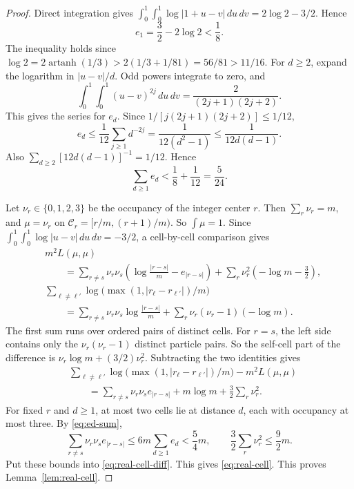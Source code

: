 \begin{proof}
Direct integration gives \(\int_0^1\!\int_0^1\log|1+u-v|\,du\,dv=2\log2-3/2\). Hence
\[
 e_1=\frac32-2\log2<\frac18.
\]
The inequality holds since \(\log2=2\operatorname{artanh}(1/3)>2(1/3+1/81)=56/81>11/16\). For \(d\ge2\), expand the logarithm in \(|u-v|/d\). Odd powers integrate to zero, and
\[
 \int_0^1\!\int_0^1(u-v)^{2j}\,du\,dv
 =\frac{2}{(2j+1)(2j+2)}.
\]
This gives the series for \(e_d\). Since \(1/[j(2j+1)(2j+2)]\le1/12\),
\[
 e_d\le\frac1{12}\sum_{j\ge1}d^{-2j}
 =\frac1{12(d^2-1)}\le\frac1{12d(d-1)}.
\]
Also \(\sum_{d\ge2}[12d(d-1)]^{-1}=1/12\). Hence
\begin{equation}\label{eq:ed-sum}
 \sum_{d\ge1}e_d<\frac18+\frac1{12}=\frac5{24}.
\end{equation}

Let \(\nu_r\in\{0,1,2,3\}\) be the occupancy of the integer center \(r\). Then \(\sum_r \nu_r=m\), and \(\mu=\nu_r\) on \(\mathcal C_r=[r/m,(r+1)/m)\). So \(\int\mu=1\). Since \(\int_0^1\int_0^1\log|u-v|\,du\,dv=-3/2\), a cell-by-cell comparison gives
\[
 \begin{aligned}
 &m^2L(\mu,\mu)\\
 &\qquad=\sum_{r\ne s}\nu_r\nu_s\left(\log\frac{|r-s|}{m}-e_{|r-s|}\right)
   +\sum_r \nu_r^2\left(-\log m-\frac32\right),\\
 &\sum_{\ell\ne\ell'}\log\bigl(\max(1,|r_\ell-r_{\ell'}|)/m\bigr)\\
 &\qquad=\sum_{r\ne s}\nu_r\nu_s\log\frac{|r-s|}{m}
   +\sum_r \nu_r(\nu_r-1)(-\log m).
 \end{aligned}
\]
The first sum runs over ordered pairs of distinct cells. For \(r=s\), the left side contains only the \(\nu_r(\nu_r-1)\) distinct particle pairs. So the self-cell part of the difference is \(\nu_r\log m+(3/2)\nu_r^2\). Subtracting the two identities gives
\begin{equation}\label{eq:real-cell-diff}
\begin{aligned}
 &\sum_{\ell\ne\ell'}\log\bigl(\max(1,|r_\ell-r_{\ell'}|)/m\bigr)-m^2L(\mu,\mu)\\
 &\qquad=\sum_{r\ne s}\nu_r\nu_s e_{|r-s|}
   +m\log m+\frac32\sum_r \nu_r^2.
\end{aligned}
\end{equation}
For fixed \(r\) and \(d\ge1\), at most two cells lie at distance \(d\), each with occupancy at most three. By \eqref{eq:ed-sum},
\[
 \sum_{r\ne s}\nu_r\nu_s e_{|r-s|}\le6m\sum_{d\ge1}e_d<\frac54m,\qquad
 \frac32\sum_r \nu_r^2\le\frac92m.
\]
Put these bounds into \eqref{eq:real-cell-diff}. This gives \eqref{eq:real-cell}. This proves Lemma~\ref{lem:real-cell}.
\end{proof}

